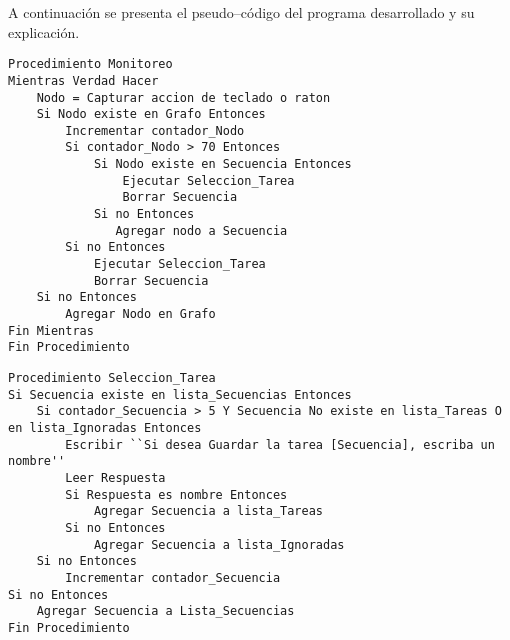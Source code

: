 
A continuaci\'on se presenta el pseudo--c\'odigo del programa desarrollado y su
 explicaci\'on.

\begin{tiny}
\begin{lstlisting}[name=monitor]
Procedimiento Monitoreo
Mientras Verdad Hacer
    Nodo = Capturar accion de teclado o raton
    Si Nodo existe en Grafo Entonces
        Incrementar contador_Nodo
        Si contador_Nodo > 70 Entonces
            Si Nodo existe en Secuencia Entonces
                Ejecutar Seleccion_Tarea
                Borrar Secuencia
            Si no Entonces
               Agregar nodo a Secuencia
        Si no Entonces
            Ejecutar Seleccion_Tarea
            Borrar Secuencia
    Si no Entonces
        Agregar Nodo en Grafo
Fin Mientras
Fin Procedimiento 
\end{lstlisting}
\end{tiny}

\begin{tiny}
\begin{lstlisting}[name=seleccion]
Procedimiento Seleccion_Tarea
Si Secuencia existe en lista_Secuencias Entonces
    Si contador_Secuencia > 5 Y Secuencia No existe en lista_Tareas O en lista_Ignoradas Entonces
        Escribir ``Si desea Guardar la tarea [Secuencia], escriba un nombre''
        Leer Respuesta
        Si Respuesta es nombre Entonces
            Agregar Secuencia a lista_Tareas
        Si no Entonces 
            Agregar Secuencia a lista_Ignoradas
    Si no Entonces
        Incrementar contador_Secuencia
Si no Entonces
    Agregar Secuencia a Lista_Secuencias
Fin Procedimiento
\end{lstlisting}
\end{tiny}
